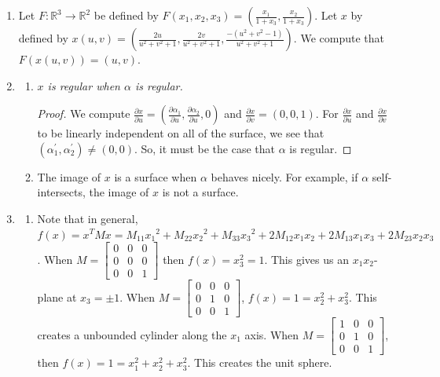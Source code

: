 \documentclass[12pt]{article}
\newcommand{\pderiv}[2][]{\frac{\partial#1}{\partial#2}}
\begin{document}
\begin{enumerate}[label=\Alph*., leftmargin=*]
    \item Let $F:\mathbb{R}^{3}\rightarrow\mathbb{R}^2$ be defined by $F(x_1, x_2, x_3)=(\frac{x_1}{1+x_3},\frac{x_2}{1+x_3})$. Let $x$ by defined by $x(u,v)=(\frac{2u}{u^2+v^2+1},\frac{2v}{u^2+v^2+1},\frac{-(u^2+v^2-1)}{u^2+v^2+1})$.
          We compute that $F(x(u,v))=(u,v)$.
    \item \begin{enumerate}[label=.\Alph*]
        \item \textit{$x$ is regular when $\alpha$ is regular.}
        \begin{proof}
            We compute $\pderiv[x]{u}=(\pderiv[\alpha_1]{u},\pderiv[\alpha_2]{u},0)$ and $\pderiv[x]{v}=(0,0,1)$. For $\pderiv[x]{u}$ and $\pderiv[x]{v}$ to be linearly independent on all of the surface, we see that $(\alpha_1^{'}, \alpha_2^{'})\neq(0,0)$. So, it must be the case that $\alpha$ is regular.
        \end{proof}
        \item The image of $x$ is a surface when $\alpha$ behaves nicely. For example, if $\alpha$ self-intersects, the image of $x$ is not a surface.
    \end{enumerate}
    \item \begin{enumerate}[label=.\Alph*]
        \item Note that in general, $f(x)=x^{T}Mx=M_{11}{x_1}^2+M_{22}{x_2}^2+M_{33}{x_3}^2+2M_{12}x_1x_2+2M_{13}x_1x_3+2M_{23}x_2x_3$. When $M=\begin{bmatrix}
            0&0&0\\
            0&0&0\\
            0&0&1
        \end{bmatrix}$ then $f(x)=x_3^2=1$. This gives us an $x_1x_2$-plane at $x_3=\pm1$. When $M=\begin{bmatrix}
            0&0&0\\
            0&1&0\\
            0&0&1
        \end{bmatrix}$, $f(x)=1=x_2^2+x_3^2$. This creates a unbounded cylinder along the $x_1$ axis. When $M=\begin{bmatrix}
            1&0&0\\
            0&1&0\\
            0&0&1
        \end{bmatrix}$, then $f(x)=1=x_1^2+x_2^2+x_3^2$. This creates the unit sphere.

\end{enumerate}
\end{enumerate}
\end{document}
